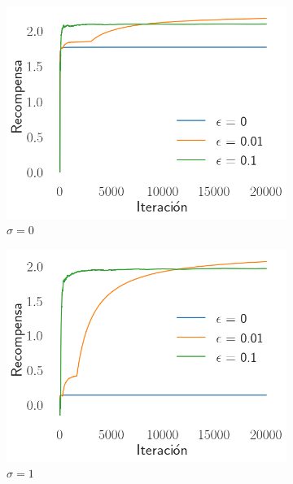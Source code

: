 \documentclass[12pt]{article}
\begin{document}
    \begin{figure}[H]
        \centering
        \begin{subfigure}[H]{0.3\textwidth}
            \includegraphics[width=\textwidth]{../img/reward_iteration_sigma_0}
            \caption{$\sigma=0$}
            \label{fig:average_reward_0}
        \end{subfigure}
        \begin{subfigure}[H]{0.3\textwidth}
            \includegraphics[width=\textwidth]{../img/reward_iteration_sigma_1}
            \caption{$\sigma=1$}
            \label{fig:average_reward_1}
        \end{subfigure}
        \begin{subfigure}[H]{0.3\textwidth}

\end{subfigure}
\end{figure}
\end{document}
